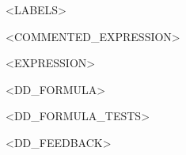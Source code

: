 \documentclass{article}
\begin{document}




<LABELS>

%
\newcommand\DDB[2]{\DDbox{#1}{<BOX_WIDTH>}{<BOX_HEIGHT>}{#2}}
\newcommand\DDBB[2]{\DDbox{#1}{10ex}{6ex}{#2}}
\newcommand\DDBBB[2]{\DDbox{#1}{12ex}{6ex}{#2}}
\newcommand\DDBBBB[2]{\DDbox{#1}{14ex}{6ex}{#2}}


<COMMENTED_EXPRESSION>

<EXPRESSION>

<DD_FORMULA>

<DD_FORMULA_TESTS>

<DD_FEEDBACK>

\writeDDlabels[4.3ex]
\end{document}
